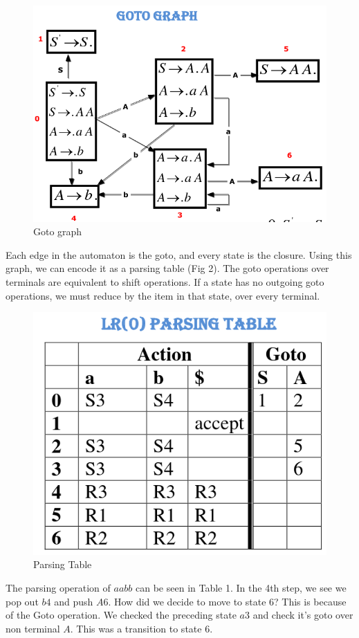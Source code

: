 \documentclass[12pt,letterpaper]{book}
\theoremstyle{definition}
\begin{document}
\begin{figure}[htpb]
  \centering
  \includegraphics[width=0.8\linewidth]{./assets/goto_graph_example.png}
  \caption{Goto graph}%
  \label{fig:}
\end{figure}

Each edge in the automaton is the goto, and every state is the closure. Using this graph, we can encode it as a parsing table (Fig 2). The goto operations over terminals are equivalent to shift operations. If a state has no outgoing goto operations, we must reduce by the item in that state, over every terminal.

\begin{figure}[htpb]
  \centering
  \includegraphics[width=0.6\linewidth]{./assets/lr0_parsing_table_example.png}
  \caption{Parsing Table}%
  \label{fig:./assets}
\end{figure}

The parsing operation of $aabb$ can be seen in Table 1. In the 4th step, we see we pop out $b4$ and push $A6$. How did we decide to move to state 6? This is because of the Goto operation. We checked the preceding state $a3$ and check it's goto over non terminal $A$. This was a transition to state 6.
\end{document}
